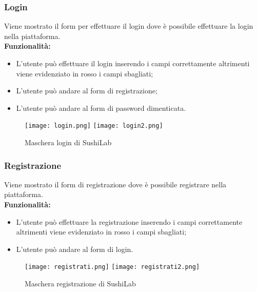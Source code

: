 \subsubsection{Login}
Viene mostrato il form per effettuare il login dove è possibile effettuare la login nella piattaforma.\\
\textbf{Funzionalità:}
\begin{itemize}
    \item L'utente può effettuare il login inserendo i campi correttamente altrimenti viene evidenziato in rosso i campi sbagliati;
    \item L'utente può andare al form di registrazione;
    \item L'utente può andare al form di password dimenticata.
\end{itemize}
\begin{figure}[H]
    \centering
    \texttt{[image: login.png]}
    \texttt{[image: login2.png]}
    \caption{Maschera login di SushiLab}
\end{figure}


\subsubsection{Registrazione}
Viene mostrato il form di registrazione dove è possibile registrare nella piattaforma.\\
\textbf{Funzionalità:}
\begin{itemize}
    \item L'utente può effettuare la registrazione inserendo i campi correttamente altrimenti viene evidenziato in rosso i campi sbagliati;
    \item L'utente può andare al form di login.
\end{itemize}
\begin{figure}[H]
    \centering
    \texttt{[image: registrati.png]}
    \texttt{[image: registrati2.png]}
    \caption{Maschera registrazione di SushiLab}
\end{figure}


